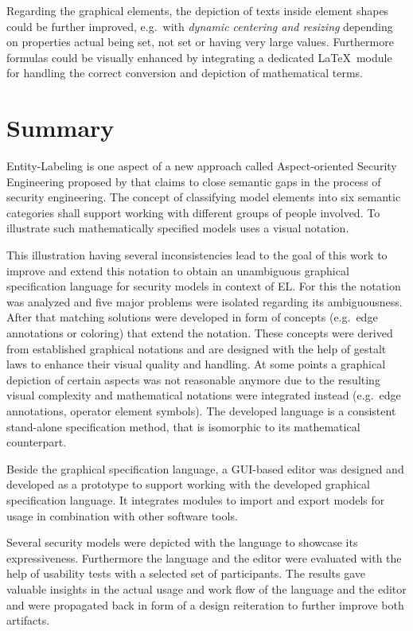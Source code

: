 \documentclass[twoside, openright, 12pt]{book}
\begin{document}
Regarding the graphical elements, the depiction of texts inside element shapes could be further improved, e.g.\ with \textit{dynamic centering and resizing} depending on properties actual being set, not set or having very large values.
Furthermore formulas could be visually enhanced by integrating a dedicated \LaTeX~module for handling the correct conversion and depiction of mathematical terms.



\cleardoublepage
\chapter{Summary}
\label{summary}
Entity-Labeling is one aspect of a new approach called Aspect-oriented Security Engineering proposed by \cite{Amthor18} that claims to close semantic gaps in the process of security engineering.
The concept of classifying model elements into six semantic categories shall support working with different groups of people involved.
To illustrate such mathematically specified models \cite{Amthor18} uses a visual notation.

This illustration having several inconsistencies lead to the goal of this work to improve and extend this notation to obtain an unambiguous graphical specification language for security models in context of EL.
For this the notation was analyzed and five major problems were isolated regarding its ambiguousness.
After that matching solutions were developed in form of concepts (e.g.\ edge annotations or coloring) that extend the notation.
These concepts were derived from established graphical notations and are designed with the help of gestalt laws to enhance their visual quality and handling.
At some points a graphical depiction of certain aspects was not reasonable anymore due to the resulting visual complexity and mathematical notations were integrated instead (e.g.\ edge annotations, operator element symbols).
The developed language is a consistent stand-alone specification method, that is isomorphic to its mathematical counterpart.

Beside the graphical specification language, a GUI-based editor was designed and developed as a prototype to support working with the developed graphical specification language.
It integrates modules to import and export models for usage in combination with other software tools.

Several security models were depicted with the language to showcase its expressiveness.
Furthermore the language and the editor were evaluated with the help of usability tests with a selected set of participants.
The results gave valuable insights in the actual usage and work flow of the language and the editor and were propagated back in form of a design reiteration to further improve both artifacts.
\end{document}

